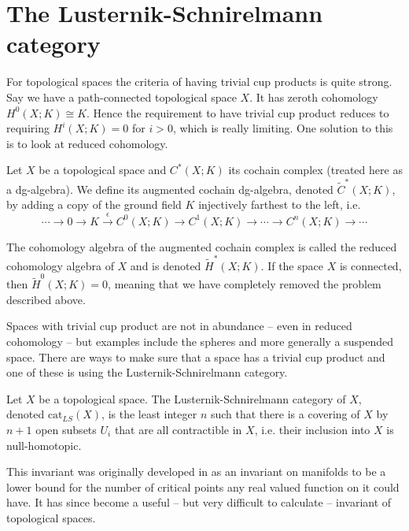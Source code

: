 
\section{The Lusternik-Schnirelmann category}

For topological spaces the criteria of having trivial cup products is quite strong. Say 
we have a path-connected topological space $X$. It has zeroth cohomology $H^0(X;K)\cong K$. 
Hence the requirement to have trivial cup product reduces to requiring $H^i(X;K)=0$ for 
$i>0$, which is really limiting. One solution to this is to look at reduced cohomology. 

\begin{definition}
    Let $X$ be a topological space and $C^\ast(X;K)$ its cochain complex (treated here as a 
    dg-algebra). We define its augmented cochain dg-algebra, denoted 
    $\widetilde{C}^\ast(X;K)$, by adding a copy of the ground field $K$ injectively farthest 
    to the left, i.e.
    \begin{equation*}
        \cdots \longrightarrow 0 \longrightarrow K \overset{\epsilon}\longrightarrow 
        C^0(X;K)\longrightarrow C^1(X;K) \longrightarrow \cdots \longrightarrow C^n(X;K) 
        \longrightarrow \cdots  
    \end{equation*}
\end{definition} 

The cohomology algebra of the augmented cochain complex is called the reduced cohomology 
algebra of $X$ and is denoted $\widetilde{H}^\ast(X;K)$. If the space $X$ is connected, 
then $\widetilde{H}^0(X;K)=0$, meaning that we have completely removed the problem 
described above. 

Spaces with trivial cup product are not in abundance -- even in reduced cohomology -- 
but examples include the spheres and more generally a suspended space. There are ways to 
make sure that a space has a trivial cup product and one of these is using the 
Lusternik-Schnirelmann category. 

\begin{definition}
    Let $X$ be a topological space. The Lusternik-Schnirelmann category of $X$, denoted 
    $\text{cat}_{LS}(X)$, is the least integer $n$ such that there is a covering of $X$ 
    by $n+1$ open subsets $U_i$ that are all contractible in $X$, i.e. their inclusion 
    into $X$ is null-homotopic.    
\end{definition}

This invariant was originally developed in \cite{lscat} as an invariant on manifolds to be 
a lower bound for the number of critical points any real valued function on it could have. 
It has since become a useful – but very difficult to calculate – invariant of topological 
spaces. 

